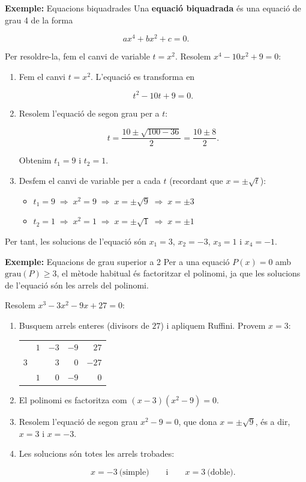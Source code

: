 \begin{exemple}{\textbf{Exemple:} Equacions biquadrades}
Una \textbf{equació biquadrada} és una equació de grau 4 de la forma

\[
ax^4+bx^2+c=0.
\]

Per resoldre-la, fem el canvi de variable $t=x^2$. Resolem $x^4-10x^2+9=0$:

\begin{enumerate}
\item Fem el canvi $t=x^2$. L'equació es transforma en

\[
t^2-10t+9=0.
\]
\item Resolem l'equació de segon grau per a $t$:

\[
t=\frac{10\pm\sqrt{100-36}}{2}=\frac{10\pm8}{2}.
\]

Obtenim $t_1=9$ i $t_2=1$.
\item Desfem el canvi de variable per a cada $t$ (recordant que $x=\pm\sqrt{t}$):

\begin{itemize}
\item $t_1=9 \;\Rightarrow\; x^2=9 \;\Rightarrow\; x=\pm\sqrt{9} \;\Rightarrow\; x=\pm 3$
\item $t_2=1 \;\Rightarrow\; x^2=1 \;\Rightarrow\; x=\pm\sqrt{1} \;\Rightarrow\; x=\pm 1$
\end{itemize}
\end{enumerate}

Per tant, les solucions de l'equació són $x_1=3$, $x_2=-3$, $x_3=1$ i $x_4=-1$.
\end{exemple}

\begin{exemple}{\textbf{Exemple:} Equacions de grau superior a 2}
Per a una equació $P(x)=0$ amb $\text{grau}(P)\ge 3$, el mètode habitual és factoritzar el polinomi, ja que les solucions de l'equació són les arrels del polinomi.

Resolem $x^3-3x^2-9x+27=0$:

\begin{enumerate}
\item Busquem arrels enteres (divisors de $27$) i apliquem Ruffini. Provem $x=3$:

\begin{center}
\renewcommand{\arraystretch}{1.25}
\begin{tabular}{r|rrrr}
 & $1$ & $-3$ & $-9$ & $27$ \\
$3$ &  & $3$ & $0$ & $-27$ \\ \hline
 & $1$ & $0$ & $-9$ & $\boxed{0}$ \\
\end{tabular}
\end{center}
\item El polinomi es factoritza com $(x-3)(x^2-9)=0$.
\item Resolem l'equació de segon grau $x^2-9=0$, que dona $x=\pm\sqrt{9}$, és a dir, $x=3$ i $x=-3$.
\item Les solucions són totes les arrels trobades:

\[
x=-3 \ \text{(simple)} \qquad \text{i} \qquad x=3 \ \text{(doble)}.
\]
\end{enumerate}
\end{exemple}

